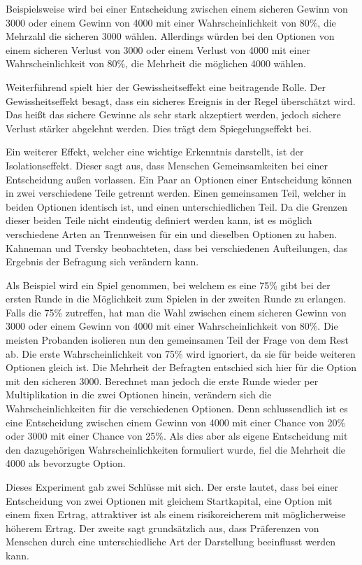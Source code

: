 Beispielsweise wird bei einer Entscheidung zwischen einem sicheren Gewinn von 3000 oder einem Gewinn von 4000 mit einer Wahrscheinlichkeit von 80\%, die Mehrzahl die sicheren 3000 wählen.\parencite[S. 266]{Kahneman.2013} Allerdings würden bei den Optionen von einem sicheren Verlust von 3000 oder einem Verlust von 4000 mit einer Wahrscheinlichkeit von 80\%, die Mehrheit die möglichen 4000 wählen.  

Weiterführend spielt hier der Gewissheitseffekt eine beitragende Rolle. Der Gewissheitseffekt besagt, dass ein sicheres Ereignis in der Regel überschätzt wird. Das heißt das sichere Gewinne als sehr stark akzeptiert werden, jedoch sichere Verlust stärker abgelehnt werden. Dies trägt dem Spiegelungseffekt bei. 

Ein weiterer Effekt, welcher eine wichtige Erkenntnis darstellt, ist der Isolationseffekt. Dieser sagt aus, dass Menschen Gemeinsamkeiten bei einer Entscheidung außen vorlassen. \parencite[S. 296]{Tversky.1972} Ein Paar an Optionen einer Entscheidung können in zwei verschiedene Teile getrennt werden. Einen gemeinsamen Teil, welcher in beiden Optionen identisch ist, und einen unterschiedlichen Teil. Da die Grenzen dieser beiden Teile nicht eindeutig definiert werden kann, ist es möglich verschiedene Arten an Trennweisen für ein und dieselben Optionen zu haben. Kahneman und Tversky beobachteten, dass bei verschiedenen Aufteilungen, das Ergebnis der Befragung sich verändern kann. 

Als Beispiel wird ein Spiel genommen, bei welchem es eine 75\% gibt bei der ersten Runde in die Möglichkeit zum Spielen in der zweiten Runde zu erlangen. Falls die 75\% zutreffen, hat man die Wahl zwischen einem sicheren Gewinn von 3000 oder einem Gewinn von 4000 mit einer Wahrscheinlichkeit von 80\%. Die meisten Probanden isolieren nun den gemeinsamen Teil der Frage von dem Rest ab. Die erste Wahrscheinlichkeit von 75\% wird ignoriert, da sie für beide weiteren Optionen gleich ist. Die Mehrheit der Befragten entschied sich hier für die Option mit den sicheren 3000. Berechnet man jedoch die erste Runde wieder per Multiplikation in die zwei Optionen hinein, verändern sich die Wahrscheinlichkeiten für die verschiedenen Optionen. Denn schlussendlich ist es eine Entscheidung zwischen einem Gewinn von 4000 mit einer Chance von 20\% oder 3000 mit einer Chance von 25\%. Als dies aber als eigene Entscheidung mit den dazugehörigen Wahrscheinlichkeiten formuliert wurde, fiel die Mehrheit die 4000 als bevorzugte Option.  

Dieses Experiment gab zwei Schlüsse mit sich. Der erste lautet, dass bei einer Entscheidung von zwei Optionen mit gleichem Startkapital, eine Option mit einem fixen Ertrag, attraktiver ist als einem risikoreicherem mit möglicherweise höherem Ertrag. Der zweite sagt grundsätzlich aus, dass Präferenzen von Menschen durch eine unterschiedliche Art der Darstellung beeinflusst werden kann. 


